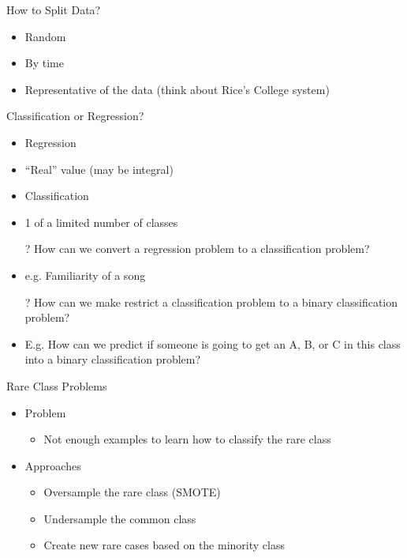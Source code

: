 \documentclass[aspectratio=169]{beamer}
\begin{document}
\begin{frame}[fragile]{How to Split Data?}

\begin{itemize}
\item Random
\item By time
\item Representative of the data (think about Rice's College system)
\end{itemize}


\end{frame}
\begin{frame}[fragile]{Classification or Regression?}

\begin{itemize}
\item Regression
\item ``Real'' value (may be integral)
\item Classification
\item 1 of a limited number of classes
\item[?] How can we convert a regression problem to a classification problem?
\item e.g. Familiarity of a song
\item[?] How can we make restrict a classification problem to a binary classification problem?
\item E.g. How can we predict if someone is going to get an A, B, or C in this class into a binary classification problem?
\end{itemize}


\end{frame}

\begin{frame}[fragile]{Rare Class Problems}

\begin{itemize}
\item Problem
  \begin{itemize}
\item Not enough examples to learn how to classify the rare class
\end{itemize}
\item Approaches 
 \begin{itemize}
 \item Oversample the rare class (SMOTE)
 \item Undersample the common class
 \item Create new rare cases based on the minority class
\end{itemize}

\end{itemize}


\end{frame}
\end{document}
